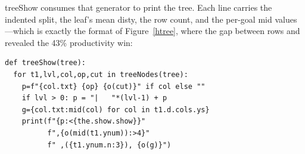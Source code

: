 \textsf{treeShow} consumes that generator to print the tree. Each
line carries the indented split, the leaf's mean \textsf{disty}, the
row count, and the per-goal \textsf{mid} values---which is exactly
the format of Figure~\ref{htree}, where the gap between rows
 and  revealed the 43\% productivity win:
\begin{verbatim}
def treeShow(tree): 
  for t1,lvl,col,op,cut in treeNodes(tree):
    p=f"{col.txt} {op} {o(cut)}" if col else ""
    if lvl > 0: p = "|   "*(lvl-1) + p
    g={col.txt:mid(col) for col in t1.d.cols.ys}
    print(f"{p:<{the.show.show}}"
          f",{o(mid(t1.ynum)):>4}"
          f" ,({t1.ynum.n:3}), {o(g)}")
\end{verbatim}

